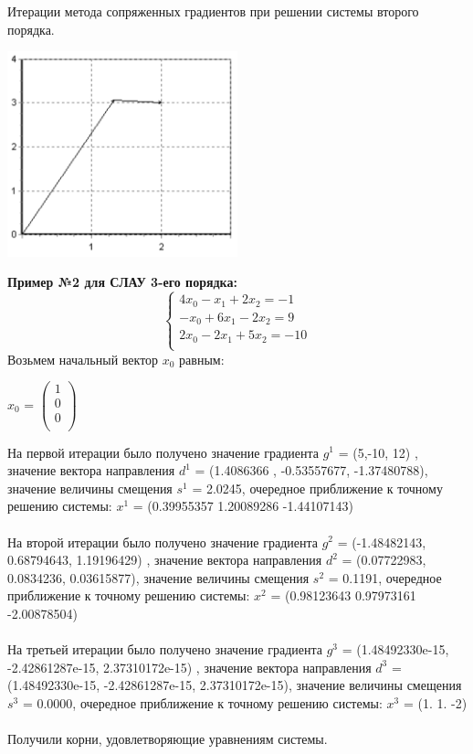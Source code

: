 \documentclass[12pt]{article}
\begin{document}
Итерации метода сопряженных градиентов при решении системы второго порядка.
\begin{center}
\includegraphics[width=0.5\textwidth]{g1}
\end{center}

\textbf{Пример №2 для СЛАУ 3-его порядка: }
\begin{equation*}
	\begin{cases}
	4x_0 -x_1 + 2x_2 = -1\\
	-x_0 + 6x_1 - 2x_2 = 9\\
	2x_0 - 2x_1 + 5x_2 = -10\\
	\end{cases}
\end{equation*}
Возьмем начальный вектор $x_0$ равным: 
\begin{center} 
	$x_0$ 
	= 
	$\begin{pmatrix}
  	1\\
  	0\\
  	0\\
  	\end{pmatrix}$
\end{center}
На первой итерации было получено значение градиента $g^1$ = (5,-10, 12) , значение вектора направления $d^1$ = (1.4086366 , -0.53557677, -1.37480788), значение величины смещения $s^1$ = 2.0245, очередное приближение к точному решению системы:
$x^1$ = (0.39955357  1.20089286 -1.44107143)\\ 
\\
На второй итерации было получено значение градиента $g^2$ = (-1.48482143, 0.68794643,  1.19196429) , значение вектора направления $d^2$ = (0.07722983, 0.0834236,  0.03615877), значение величины смещения $s^2$ = 0.1191, очередное приближение к точному решению системы:
$x^2$ = (0.98123643  0.97973161 -2.00878504)\\ 
\\
На третьей итерации было получено значение градиента $g^3$ = (1.48492330e-15, -2.42861287e-15,  2.37310172e-15) , значение вектора направления $d^3$ = (1.48492330e-15, -2.42861287e-15,  2.37310172e-15), значение величины смещения $s^3$ = 0.0000, очередное приближение к точному решению системы:
$x^3$ = (1.  1. -2)\\ 
\\
Получили корни, удовлетворяющие уравнениям системы.
\end{document}
